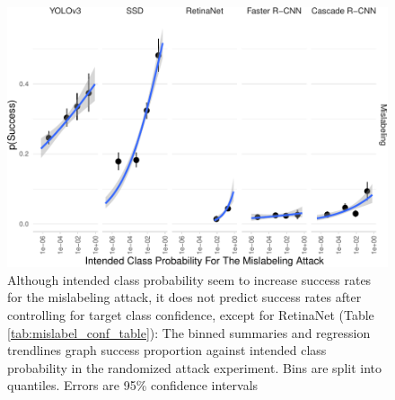\documentclass[
]{article}
\begin{document}
\begin{figure}[tb]

{\centering \includegraphics{imgs/mislabel_conf_graph-1} 

}

\caption{Although intended class probability seem to increase success rates for the mislabeling attack, it does not predict success rates after controlling for target class confidence, except for RetinaNet (Table \ref{tab:mislabel_conf_table}):  The binned summaries and regression trendlines graph success proportion against intended class probability in the randomized attack experiment. Bins are split into quantiles. Errors are 95\% confidence intervals}\label{fig:mislabel_conf_graph}
\end{figure}

\begingroup\fontsize{9}{11}\selectfont
\end{document}
